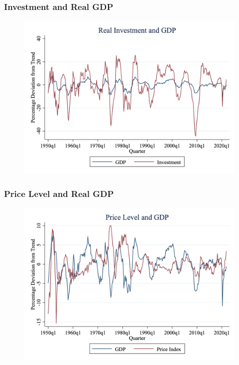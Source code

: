 \documentclass{beamer}
\begin{document}
\begin{frame}
\frametitle[alignment=center]{Investment and Real GDP}
\begin{figure}
\centering
\includegraphics[scale=0.25]{Figures/Fig_3pt10.png}
\end{figure}
\end{frame}


\begin{frame}
\frametitle[alignment=center]{Price Level and Real GDP}
\begin{figure}
\centering
\includegraphics[scale=0.25]{Figures/Fig_3pt11.png}
\end{figure}
\end{frame}
\end{document}
